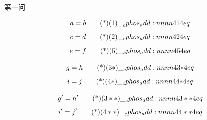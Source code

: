 \documentclass[answer]{cphos}
\begin{document}
\begin{problem}[20]{}

\begin{problemstatement}
 第一问
\end{problemstatement}

\begin{solution}
\begin{equation}
    a = b \eqtagscore{1}{4}
\end{equation}
\begin{equation}
    c = d \eqtagscore{2}{4}
\end{equation}
\begin{equation}
    e = f \eqtagscore{5}{4}
\end{equation}
\begin{multisol}[nomainsol]
\item
\begin{equation}
    g = h \eqtagscore{3*}{4}
\end{equation}
\begin{equation}
    i = j \eqtagscore{4*}{4}
\end{equation}
\item
\begin{equation}
    g' = h' \eqtagscore{3**}{4}
\end{equation}
\begin{equation}
    i' = j' \eqtagscore{4**}{4}
\end{equation}
\end{multisol}
\scoring
\end{solution}
\end{problem}
\end{document}
